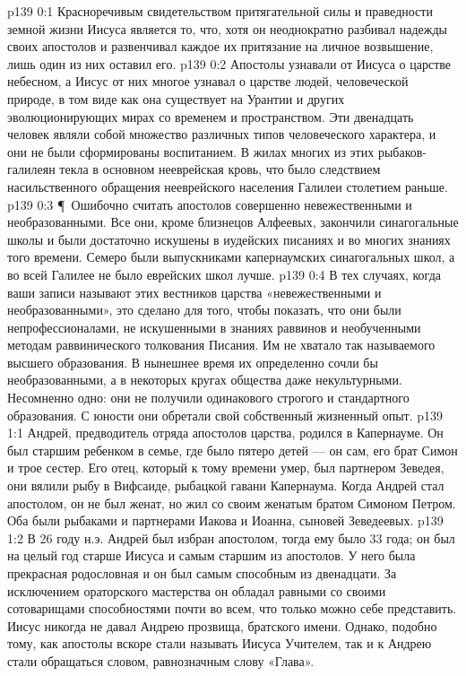 \vs p139 0:1 Красноречивым свидетельством притягательной силы и праведности земной жизни Иисуса является то, что, хотя он неоднократно разбивал надежды своих апостолов и развенчивал каждое их притязание на личное возвышение, лишь один из них оставил его.
\vs p139 0:2 Апостолы узнавали от Иисуса о царстве небесном, а Иисус от них многое узнавал о царстве людей, человеческой природе, в том виде как она существует на Урантии и других эволюционирующих мирах со временем и пространством. Эти двенадцать человек являли собой множество различных типов человеческого характера, и они не были сформированы  воспитанием. В жилах многих из этих рыбаков\hyp{}галилеян текла в основном нееврейская кровь, что было следствием насильственного обращения нееврейского населения Галилеи столетием раньше.
\vs p139 0:3 \P\ Ошибочно считать апостолов совершенно невежественными и необразованными. Все они, кроме близнецов Алфеевых, закончили синагогальные школы и были достаточно искушены в иудейских писаниях и во многих знаниях того времени. Семеро были выпускниками капернаумских синагогальных школ, а во всей Галилее не было еврейских школ лучше.
\vs p139 0:4 В тех случаях, когда ваши записи называют этих вестников царства «невежественными и необразованными», это сделано для того, чтобы показать, что они были непрофессионалами, не искушенными в знаниях раввинов и необученными методам раввинического толкования Писания. Им не хватало так называемого высшего образования. В нынешнее время их определенно сочли бы необразованными, а в некоторых кругах общества даже некультурными. Несомненно одно: они не получили одинакового строгого и стандартного образования. С юности они обретали свой собственный жизненный опыт.
\vs p139 1:1 Андрей, предводитель отряда апостолов царства, родился в Капернауме. Он был старшим ребенком в семье, где было пятеро детей --- он сам, его брат Симон и трое сестер. Его отец, который к тому времени умер, был партнером Зеведея, они вялили рыбу в Вифсаиде, рыбацкой гавани Капернаума. Когда Андрей стал апостолом, он не был женат, но жил со своим женатым братом Симоном Петром. Оба были рыбаками и партнерами Иакова и Иоанна, сыновей Зеведеевых.
\vs p139 1:2 В 26 году н.э. Андрей был избран апостолом, тогда ему было 33 года; он был на целый год старше Иисуса и самым старшим из апостолов. У него была прекрасная родословная и он был самым способным из двенадцати. За исключением ораторского мастерства он обладал равными со своими сотоварищами способностями почти во всем, что только можно себе представить. Иисус никогда не давал Андрею прозвища, братского имени. Однако, подобно тому, как апостолы вскоре стали называть Иисуса Учителем, так и к Андрею стали обращаться словом, равнозначным слову «Глава».
